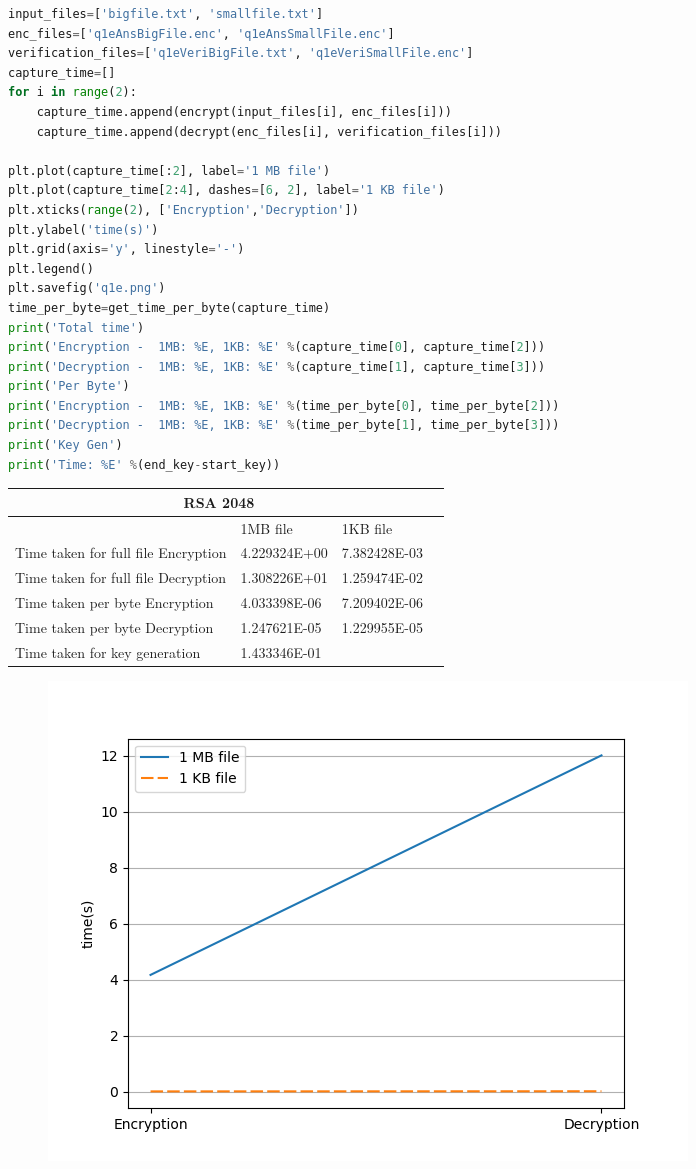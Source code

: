 \documentclass[12pt]{article}%
\begin{document}
\begin{lstlisting}[language=Python]
input_files=['bigfile.txt', 'smallfile.txt']
enc_files=['q1eAnsBigFile.enc', 'q1eAnsSmallFile.enc']
verification_files=['q1eVeriBigFile.txt', 'q1eVeriSmallFile.enc']
capture_time=[]
for i in range(2):
    capture_time.append(encrypt(input_files[i], enc_files[i]))
    capture_time.append(decrypt(enc_files[i], verification_files[i]))

plt.plot(capture_time[:2], label='1 MB file')
plt.plot(capture_time[2:4], dashes=[6, 2], label='1 KB file')
plt.xticks(range(2), ['Encryption','Decryption'])
plt.ylabel('time(s)')
plt.grid(axis='y', linestyle='-')
plt.legend()
plt.savefig('q1e.png')
time_per_byte=get_time_per_byte(capture_time)
print('Total time')
print('Encryption -  1MB: %E, 1KB: %E' %(capture_time[0], capture_time[2]))
print('Decryption -  1MB: %E, 1KB: %E' %(capture_time[1], capture_time[3]))
print('Per Byte')
print('Encryption -  1MB: %E, 1KB: %E' %(time_per_byte[0], time_per_byte[2]))
print('Decryption -  1MB: %E, 1KB: %E' %(time_per_byte[1], time_per_byte[3]))
print('Key Gen')
print('Time: %E' %(end_key-start_key))

\end{lstlisting}

\begin{tabular}{ |p{8cm}|p{3cm}|p{3cm}|p{3cm} }
 \hline
 \multicolumn{3}{|c|}{RSA 2048} \\
 \hline
	 & 1MB file & 1KB file\\
 \hline
 Time taken for full file Encryption   & 4.229324E+00     &7.382428E-03   \\
  \hline
 Time taken for full file Decryption & 1.308226E+01   & 	1.259474E-02\\
 \hline
 Time taken per byte Encryption   & 4.033398E-06     & 7.209402E-06  \\
  \hline
 Time taken per byte Decryption & 1.247621E-05   &1.229955E-05 	\\
 \hline
 Time taken for key generation &  1.433346E-01  & 	\\
 \hline
\end{tabular}
\begin{figure}[h]
    \centering
	\includegraphics[scale=0.5]{q1e}
\end{figure}
\end{document}
